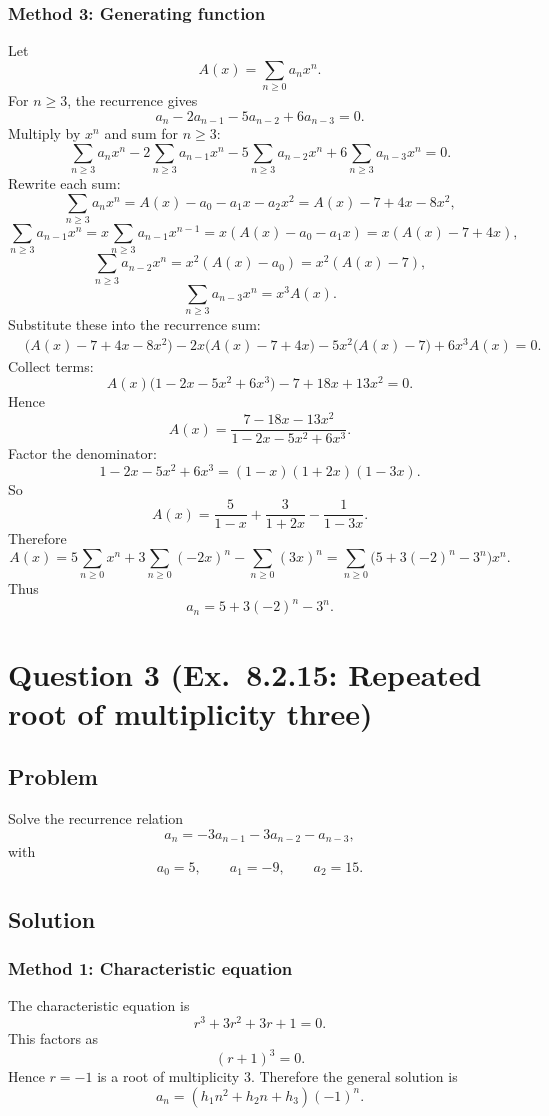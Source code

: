 \documentclass[12pt]{article}
\begin{document}
\newpage
\subsubsection{Method 3: Generating function}
Let
\[
A(x)=\sum_{n\ge 0} a_n x^n.
\]
For \(n\ge 3\), the recurrence gives
\[
a_n-2a_{n-1}-5a_{n-2}+6a_{n-3}=0.
\]
Multiply by \(x^n\) and sum for \(n\ge 3\):
\[
\sum_{n\ge 3} a_n x^n
-2\sum_{n\ge 3} a_{n-1}x^n
-5\sum_{n\ge 3} a_{n-2}x^n
+6\sum_{n\ge 3} a_{n-3}x^n
=0.
\]
Rewrite each sum:
\[
\sum_{n\ge 3} a_n x^n=A(x)-a_0-a_1x-a_2x^2=A(x)-7+4x-8x^2,
\]
\[
\sum_{n\ge 3} a_{n-1}x^n=x\sum_{n\ge 3} a_{n-1}x^{n-1}=x(A(x)-a_0-a_1x)=x(A(x)-7+4x),
\]
\[
\sum_{n\ge 3} a_{n-2}x^n=x^2(A(x)-a_0)=x^2(A(x)-7),
\]
\[
\sum_{n\ge 3} a_{n-3}x^n=x^3 A(x).
\]
Substitute these into the recurrence sum:
\begin{align*}
&\bigl(A(x)-7+4x-8x^2\bigr)
-2x\bigl(A(x)-7+4x\bigr)
-5x^2\bigl(A(x)-7\bigr)
+6x^3A(x)=0.
\end{align*}
Collect terms:
\[
A(x)\bigl(1-2x-5x^2+6x^3\bigr)-7+18x+13x^2=0.
\]
Hence
\[
A(x)=\frac{7-18x-13x^2}{1-2x-5x^2+6x^3}.
\]
Factor the denominator:
\[
1-2x-5x^2+6x^3=(1-x)(1+2x)(1-3x).
\]
So
\[
A(x)=\frac{5}{1-x}+\frac{3}{1+2x}-\frac{1}{1-3x}.
\]
Therefore
\[
A(x)=5\sum_{n\ge 0}x^n+3\sum_{n\ge 0}(-2x)^n-\sum_{n\ge 0}(3x)^n
=\sum_{n\ge 0}\bigl(5+3(-2)^n-3^n\bigr)x^n.
\]
Thus
\[
\boxed{a_n=5+3(-2)^n-3^n.}
\]

\newpage

\section{Question 3 (Ex.\ 8.2.15: Repeated root of multiplicity three)}

\subsection{Problem}
Solve the recurrence relation
\[
a_n=-3a_{n-1}-3a_{n-2}-a_{n-3},
\]
with
\[
a_0=5,\qquad a_1=-9,\qquad a_2=15.
\]

\subsection{Solution}

\subsubsection{Method 1: Characteristic equation}
The characteristic equation is
\[
r^3+3r^2+3r+1=0.
\]
This factors as
\[
(r+1)^3=0.
\]
Hence \(r=-1\) is a root of multiplicity \(3\). Therefore the general solution is
\[
a_n=(h_1 n^2+h_2 n+h_3)(-1)^n.
\]
\end{document}
